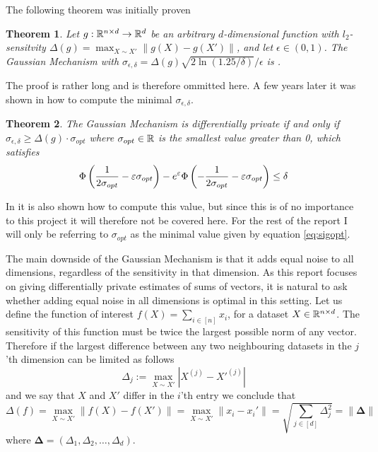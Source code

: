 \documentclass[a4paper,12pt]{article}
\newtheorem{theorem}{Theorem}
\begin{document}
The following theorem was initially proven
\begin{theorem}\textnormal{\cite{dpbasic}}
\label{theo:gaussMech}
Let $g: \mathbb{R}^{n \times d} \rightarrow \mathbb{R}^{d}$ be an arbitrary 
$d$-dimensional function with $l_2$-sensitvity 
$ \Delta(g) = \max_{X \sim X'} \| g(X) - g(X') \|$, 
and let $\epsilon \in (0,1)$.
The Gaussian Mechanism with
$\sigma_{\epsilon, \delta} = \Delta(g)  \sqrt{2\ln(1.25/\delta)}/\epsilon$ 
is \edp.
\end{theorem}
The proof is rather long and is therefore ommitted here. A few years later it was shown in \cite{BalleWang} how to compute the minimal $\sigma_{\epsilon, \delta}$.
\begin{theorem}\textnormal{\cite{BalleWang}}
\label{theo:OptSig}
The Gaussian Mechanism is differentially private if and only if $\sigma_{\epsilon, \delta} \ge \Delta(g) \cdot \sigma_{opt}$ where
$\sigma_{opt} \in \mathbb{R}$ is the smallest value greater than 0, which satisfies
\begin{equation}
\label{eq:sigopt}
    \Phi \left (\frac{1}{2\sigma_{opt}} - \varepsilon\sigma_{opt}\right) - e^{\varepsilon} \Phi \left (-\frac{1}{2\sigma_{opt}} - \varepsilon\sigma_{opt}\right) \le \delta
\end{equation}
\end{theorem}
In \cite{BalleWang} it is also shown how to compute this value, but since this is of no importance to this project it will therefore not be covered here.
For the rest of the report I will only be referring to $\sigma_{opt}$ as the minimal value given by equation \eqref{eq:sigopt}.

The main downside of the Gaussian Mechanism is that it adds equal noise to all dimensions, regardless of the sensitivity in that dimension.
As this report focuses on giving differentially private estimates of sums of vectors, it is natural to ask whether adding equal noise in all dimensions
is optimal in this setting. Let us define the function of interest $f(X) = \sum_{i \in [n]} x_i$, for a dataset $X \in \mathbb{R}^{n \times d}$. 
The sensitivity of this function must be twice the largest possible norm of any vector.
Therefore if the largest difference between any two neighbouring datasets 
in the $j$'th dimension can be limited as follows
\begin{equation}
\label{eq:DimCon}
    \Delta_j := \max_{X \sim X'}|X^{(j)} - X'^{(j)}|
\end{equation}
and we say that $X$ and $X'$ differ in the $i$'th entry we conclude that
\begin{equation}
\label{eq:DelF}
    \Delta(f) = \max_{X \sim X'} \| f(X) - f(X') \| = 
    \max_{X \sim X'} \| x_i - x_i' \| = \sqrt{\sum_{j \in [d]} \Delta_j^2} = \|\bm{\Delta}\|
\end{equation}
where $\bm{\Delta} = (\Delta_1, \Delta_2, \dots, \Delta_d)$.
\end{document}
